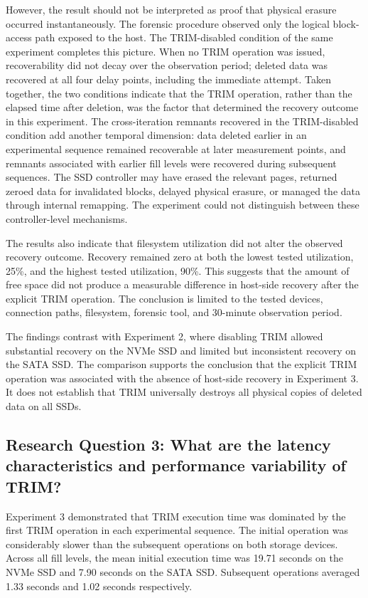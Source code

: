 However, the result should not be interpreted as proof that physical erasure occurred instantaneously. The forensic procedure observed only the logical block-access 
path exposed to the host.  The TRIM-disabled condition of the same experiment completes this picture. When no TRIM operation was issued, recoverability did not decay 
over the observation period; deleted data was recovered at all four delay points, including the immediate attempt. Taken together, the two conditions indicate that the 
TRIM operation, rather than the elapsed time after deletion, was the factor that determined the recovery outcome in this experiment. The cross-iteration remnants 
recovered in the TRIM-disabled condition add another temporal dimension: data deleted earlier in an experimental sequence remained recoverable at later measurement 
points, and remnants associated with earlier fill levels were recovered during subsequent sequences. The SSD controller may have erased the relevant pages, returned zeroed data for invalidated blocks, delayed physical erasure, or managed the 
data through internal remapping. The experiment could not distinguish between these controller-level mechanisms. 

The results also indicate that filesystem utilization did not alter the observed recovery outcome. Recovery remained zero at both the lowest tested utilization, 25\%, 
and the highest tested utilization, 90\%. This suggests that the amount of free space did not produce a measurable difference in host-side recovery after the explicit 
TRIM operation. The conclusion is limited to the tested devices, connection paths, filesystem, forensic tool, and 30-minute observation period.

The findings contrast with Experiment 2, where disabling TRIM allowed substantial recovery on the NVMe SSD and limited but inconsistent recovery on the SATA SSD. The 
comparison supports the conclusion that the explicit TRIM operation was associated with the absence of host-side recovery in Experiment 3. It does not establish that 
TRIM universally destroys all physical copies of deleted data on all SSDs.

\subsection*{Research Question 3: What are the latency characteristics and performance variability of TRIM?}
Experiment 3 demonstrated that TRIM execution time was dominated by the first TRIM operation in each experimental sequence. The initial operation was considerably slower 
than the subsequent operations on both storage devices. Across all fill levels, the mean initial execution time was 19.71 seconds on the NVMe SSD and 7.90 seconds on 
the SATA SSD. Subsequent operations averaged 1.33 seconds and 1.02 seconds respectively. 

